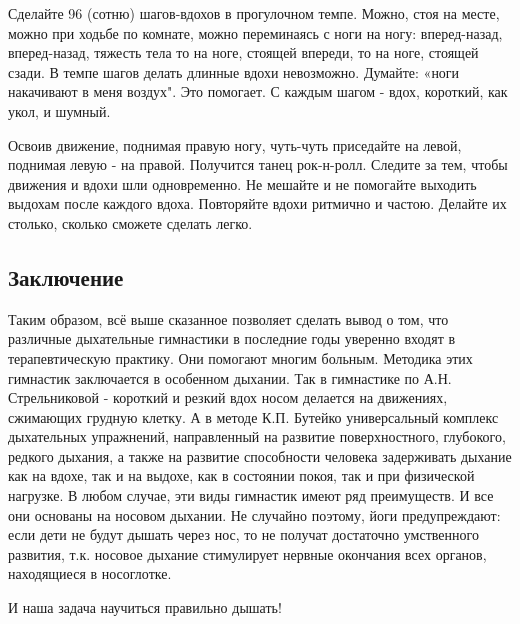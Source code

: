 \documentclass[14pt, a4paper]{article}
\begin{document}
    Сделайте 96 (сотню) шагов-вдохов в прогулочном темпе. Можно, стоя на месте, можно при ходьбе по комнате, можно переминаясь с ноги на ногу: вперед-назад, вперед-назад, тяжесть тела то на ноге, стоящей впереди, то на ноге, стоящей сзади. В темпе шагов делать длинные вдохи невозможно. Думайте: «ноги накачивают в меня воздух". Это помогает. С каждым шагом - вдох, короткий, как укол, и шумный.

    Освоив движение, поднимая правую ногу, чуть-чуть приседайте на левой, поднимая левую - на правой. Получится танец рок-н-ролл. Следите за тем, чтобы движения и вдохи шли одновременно. Не мешайте и не помогайте выходить выдохам после каждого вдоха. Повторяйте вдохи ритмично и частою. Делайте их столько, сколько сможете сделать легко.

    \subsection{Заключение}
    Таким образом, всё выше сказанное позволяет сделать вывод о том, что различные дыхательные гимнастики в последние годы уверенно входят в терапевтическую практику. Они помогают многим больным. Методика этих гимнастик заключается в особенном дыхании. Так в гимнастике по А.Н. Стрельниковой - короткий и резкий вдох носом делается на движениях, сжимающих грудную клетку. А в методе К.П. Бутейко универсальный комплекс дыхательных упражнений, направленный на развитие поверхностного, глубокого, редкого дыхания, а также на развитие способности человека задерживать дыхание как на вдохе, так и на выдохе, как в состоянии покоя, так и при физической нагрузке. В любом случае, эти виды гимнастик имеют ряд преимуществ. И все они основаны на носовом дыхании. Не случайно поэтому, йоги предупреждают: если дети не будут дышать через нос, то не получат достаточно умственного развития, т.к. носовое дыхание стимулирует нервные окончания всех органов, находящиеся в носоглотке.

    И наша задача научиться правильно дышать!
\end{document}
